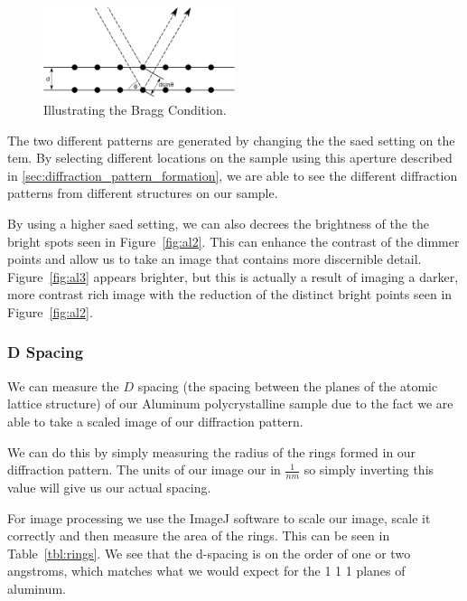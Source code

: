 \documentclass[12pt,a4paper]{article}
\begin{document}
\begin{figure}
  \includegraphics[width=0.5\textwidth]{data/1024px-BraggPlaneDiffraction.svg.png}
  \caption{Illustrating the Bragg Condition\cite{wikibragg}.}
  \label{fig:d_space}
\end{figure}

The two different patterns are generated by changing the the \ac{saed} setting on the \ac{tem}.  By selecting different locations on the sample using this aperture described in \ref{sec:diffraction_pattern_formation}, we are able to see the different diffraction patterns from different structures on our sample.

By using a higher \ac{saed} setting, we can also decrees the brightness of the the bright spots seen in Figure~\ref{fig:al2}.  This can enhance the contrast of the dimmer points and allow us to take an image that contains more discernible detail.  Figure~\ref{fig:al3} appears brighter, but this is actually a result of imaging a darker, more contrast rich image with the reduction of the distinct bright points seen in Figure~\ref{fig:al2}.

\subsubsection{D Spacing} %
\label{ssub:d_spacing}

We can measure the $D$ spacing (the spacing between the planes of the atomic lattice structure) of our Aluminum polycrystalline sample due to the fact we are able to take a scaled image of our diffraction pattern.

We can do this by simply measuring the radius of the rings formed in our diffraction pattern.  The units of our image our in $\frac{1}{nm}$ so simply inverting this value will give us our actual spacing.

For image processing we use the ImageJ\cite{imagejs} software to scale our image, scale it correctly and then measure the area of the rings.  This can be seen in Table~\ref{tbl:rings}.  We see that the d-spacing is on the order of one or two angstroms, which matches what we would expect for the 1 1 1 planes of aluminum\cite{aluminum}.
\end{document}
